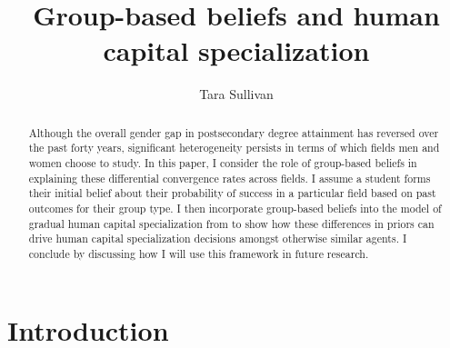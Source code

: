 \documentclass[11 pt]{article}
\newcommand{\toedit}[1]{{\color{gray}#1}}
\newcommand{\toedit}[1]{#1}
\begin{document}

\title{Group-based beliefs and human capital specialization}
\author{Tara Sullivan%
}

\maketitle
\onehalfspacing


\begin{abstract}
Although the overall gender gap in postsecondary degree attainment has reversed over the past forty years, significant heterogeneity persists in terms of which fields men and women choose to study.
In this paper, I consider the role of group-based beliefs in explaining these differential convergence rates across fields. 
I assume a student forms their initial belief about their probability of success in a particular field based on past outcomes for their group type. 
I then incorporate group-based beliefs into the model of gradual human capital specialization from \textcite{AF20} to show how these differences in priors can drive human capital specialization decisions amongst otherwise similar agents.
I conclude by discussing how I will use this framework in future research.


 

\end{abstract}

\section{Introduction}\label{sec:intro}
\end{document}
